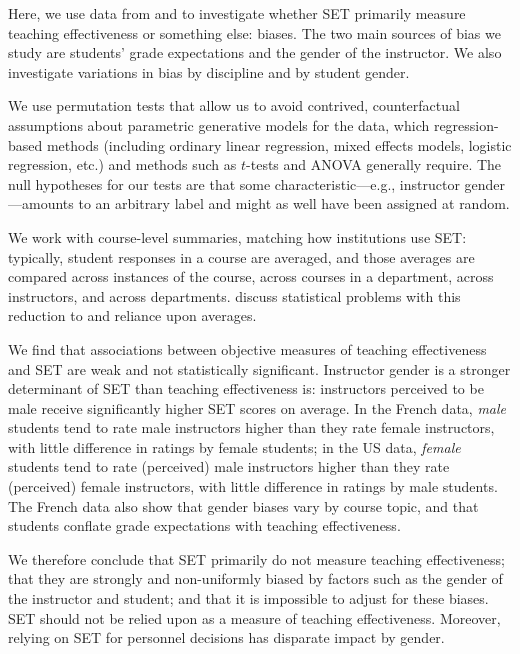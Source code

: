 \documentclass[12pt]{article}
\begin{document}
Here, we use data from \citet{Boring2015} and \citet{MacNell2014} to investigate 
whether SET
primarily measure teaching effectiveness or something else: biases.
The two main sources of bias we study are students' grade expectations and the gender of the 
instructor. 
We also investigate variations in bias by discipline and by student gender.

We use permutation tests that allow us to avoid 
contrived, counterfactual assumptions about
parametric generative models for the data, which regression-based methods (including
ordinary linear regression, mixed effects models, logistic regression, etc.) and
methods such as $t$-tests and ANOVA generally require.
The null hypotheses for our tests are that some 
characteristic---e.g., instructor gender---amounts to an arbitrary label and might as well
have been assigned at random. 

We work with course-level summaries, matching how institutions use SET: 
typically, student responses in a course
are averaged, and those averages are compared across instances of the course,
across courses in a department, across instructors, and across departments.
\citet{StarkFreishtat2014} discuss statistical problems with this reduction to 
and reliance upon averages.

We find that associations between objective measures of teaching effectiveness and SET are weak
and not statistically significant.
Instructor gender is a stronger determinant of SET than teaching effectiveness is:
instructors perceived to be male receive significantly higher SET scores on average.
In the French data, \emph{male} students tend to rate male instructors higher
than they rate female instructors, with little difference in ratings by female students;
in the US data, \emph{female} students tend to rate (perceived) male instructors 
higher than they rate (perceived) female instructors, with little difference in ratings by male students. 
The French data also show that gender biases vary by course topic, and 
that students conflate grade expectations with teaching effectiveness.

We therefore conclude that SET primarily do not measure teaching effectiveness; that 
they are strongly and non-uniformly biased by factors such as the gender of the instructor
and student; and that it is impossible to adjust for these biases. 
SET should not be relied upon as a measure of teaching effectiveness.
Moreover, relying on SET for personnel decisions has disparate impact by gender. 
\end{document}
